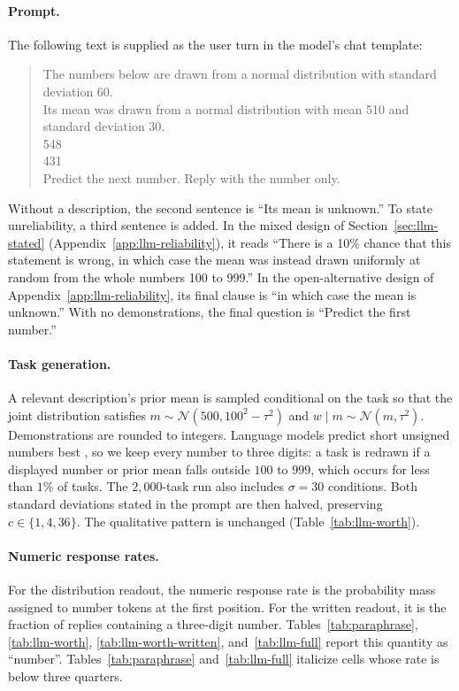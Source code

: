 \documentclass{article}
\theoremstyle{definition}
\begin{document}
\paragraph{Prompt.}
The following text is supplied as the user turn in the model's chat template:
\begin{quote}\scriptsize\ttfamily\raggedright
The numbers below are drawn from a normal distribution with standard deviation 60.\\
Its mean was drawn from a normal distribution with mean 510 and standard deviation 30.\\[3pt]
548\\
431\\[3pt]
Predict the next number. Reply with the number only.
\end{quote}

Without a description, the second sentence is ``Its mean is unknown.'' To state unreliability, a third sentence is added. In the mixed design of Section~\ref{sec:llm-stated} (Appendix~\ref{app:llm-reliability}), it reads ``There is a 10\% chance that this statement is wrong, in which case the mean was instead drawn uniformly at random from the whole numbers 100 to 999.'' In the open-alternative design of Appendix~\ref{app:llm-reliability}, its final clause is ``in which case the mean is unknown.'' With no demonstrations, the final question is ``Predict the first number.''

\paragraph{Task generation.}
A relevant description's prior mean is sampled conditional on the task so that the joint distribution satisfies $m \sim \mathcal{N}(500,100^2-\tau^2)$ and $w\mid m \sim \mathcal{N}(m,\tau^2)$. Demonstrations are rounded to integers. Language models predict short unsigned numbers best \citep{gruver2023,requeima2024}, so we keep every number to three digits: a task is redrawn if a displayed number or prior mean falls outside $100$ to $999$, which occurs for less than $1\%$ of tasks. The $2{,}000$-task run also includes $\sigma = 30$ conditions. Both standard deviations stated in the prompt are then halved, preserving $c \in \{1,4,36\}$. The qualitative pattern is unchanged (Table~\ref{tab:llm-worth}).

\paragraph{Numeric response rates.}
For the distribution readout, the numeric response rate is the probability mass assigned to number tokens at the first position. For the written readout, it is the fraction of replies containing a three-digit number. Tables~\ref{tab:paraphrase}, \ref{tab:llm-worth}, \ref{tab:llm-worth-written}, and~\ref{tab:llm-full} report this quantity as ``number''. Tables~\ref{tab:paraphrase} and~\ref{tab:llm-full} italicize cells whose rate is below three quarters.
\end{document}
